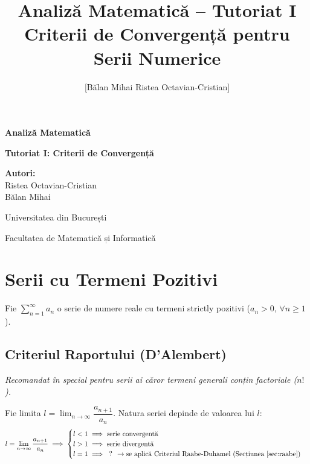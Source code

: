 \documentclass[12pt, a4paper]{report}
\title{Analiză Matematică -- Tutoriat I\\ Criterii de Convergență pentru Serii Numerice}
\author{[Bălan Mihai Ristea Octavian-Cristian]}
\begin{document}
	
	\begin{titlepage}
		\centering
		\vspace*{2cm}
		{\Huge \bfseries Analiză Matematică \par}
		\vspace{1cm}
		{\Large \bfseries Tutoriat I: Criterii de Convergență \par}
		\vspace{0.5cm}
		\vfill
		{\Large \textbf{Autori:} \\ Ristea Octavian-Cristian \\ Bălan Mihai \par}
		\vspace{1.5cm}
		{\large Universitatea din București \par}
		{\large Facultatea de Matematică și Informatică \par}
		\vspace{2cm}
	\end{titlepage}
	
	
	\cleardoublepage
	\tableofcontents
	\cleardoublepage
	
	\pagestyle{main}
	
	\chapter{Serii cu Termeni Pozitivi}
	
	Fie $\sum_{n=1}^{\infty} a_n$ o serie de numere reale cu termeni strictly pozitivi ($a_n > 0, \, \forall n \ge 1$).
	
	\section{Criteriul Raportului (D'Alembert)}
	\textit{Recomandat în special pentru serii ai căror termeni generali conțin factoriale ($n!$).}
	
	Fie limita $l = \lim_{n \to \infty} \dfrac{a_{n+1}}{a_n}$. Natura seriei depinde de valoarea lui $l$:
	\[
	l = \lim_{n \to \infty} \frac{a_{n+1}}{a_n} \implies 
	\begin{cases} 
		l < 1 \implies \text{serie convergentă} \\ 
		l > 1 \implies \text{serie divergentă} \\ 
		l = 1 \implies \text{ ? } \to \text{se aplică Criteriul Raabe-Duhamel (Secțiunea \ref{sec:raabe})}
	\end{cases}
	\]
	
\end{document}

